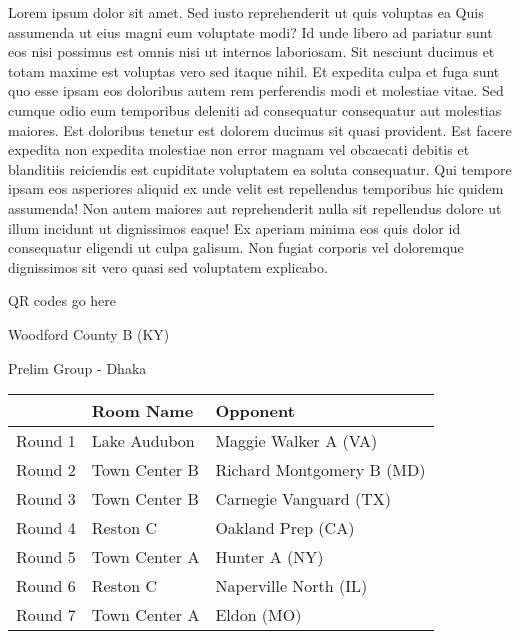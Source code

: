 \documentclass{article}%
\begin{document}
\vspace*{8pt}%
\linebreak%
\newline%
\newline%
Lorem ipsum dolor sit amet. Sed iusto reprehenderit ut quis voluptas ea Quis assumenda ut eius magni eum voluptate modi? Id unde libero ad pariatur sunt eos nisi possimus est omnis nisi ut internos laboriosam. Sit nesciunt ducimus et totam maxime est voluptas vero sed itaque nihil. Et expedita culpa et fuga sunt quo esse ipsam eos doloribus autem rem perferendis modi et molestiae vitae.\newline%
\newline%
Sed cumque odio eum temporibus deleniti ad consequatur consequatur aut molestias maiores. Est doloribus tenetur est dolorem ducimus sit quasi provident. Est facere expedita non expedita molestiae non error magnam vel obcaecati debitis et blanditiis reiciendis est cupiditate voluptatem ea soluta consequatur. Qui tempore ipsam eos asperiores aliquid ex unde velit est repellendus temporibus hic quidem assumenda!\newline%
\newline%
Non autem maiores aut reprehenderit nulla sit repellendus dolore ut illum incidunt ut dignissimos eaque! Ex aperiam minima eos quis dolor id consequatur eligendi ut culpa galisum. Non fugiat corporis vel doloremque dignissimos sit vero quasi sed voluptatem explicabo.\newline%
\newline%
%
\vspace*{30pt}%
\begin{center}%
\begin{Huge}%
QR codes go here%
\end{Huge}%
\end{center}%
\newpage%
%
\begin{center}%
\begin{Huge}%
Woodford County B (KY)%
\end{Huge}%
\vspace*{8pt}%
\linebreak%
\begin{Large}%
Prelim Group {-} Dhaka%
\end{Large}%
\end{center}%
\begin{tabularx}{\textwidth}{|c|Y|Y|}%
\hline%
&Room Name&Opponent\\%
\hline%
Round 1&Lake Audubon&Maggie Walker A (VA)\\%
Round 2&Town Center B&Richard Montgomery B (MD)\\%
Round 3&Town Center B&Carnegie Vanguard (TX)\\%
Round 4&Reston C&Oakland Prep (CA)\\%
Round 5&Town Center A&Hunter A (NY)\\%
Round 6&Reston C&Naperville North (IL)\\%
Round 7&Town Center A&Eldon (MO)\\%
\hline%
\end{tabularx}%
\end{document}
